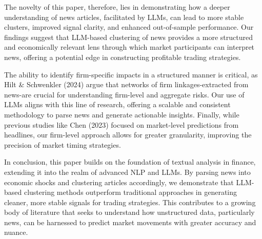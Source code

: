 The novelty of this paper, therefore, lies in demonstrating how a deeper understanding of news articles, facilitated by LLMs, can lead to more stable clusters, improved signal clarity, and enhanced out-of-sample performance. Our findings suggest that LLM-based clustering of news provides a more structured and economically relevant lens through which market participants can interpret news, offering a potential edge in constructing profitable trading strategies.

The ability to identify firm-specific impacts in a structured manner is critical, as Hilt \& Schwenkler (2024) argue that networks of firm linkages-extracted from news-are crucial for understanding firm-level and aggregate risks. Our use of LLMs aligns with this line of research, offering a scalable and consistent methodology to parse news and generate actionable insights. Finally, while previous studies like Chen (2023) focused on market-level predictions from headlines, our firm-level approach allows for greater granularity, improving the precision of market timing strategies.

In conclusion, this paper builds on the foundation of textual analysis in finance, extending it into the realm of advanced NLP and LLMs. By parsing news into economic shocks and clustering articles accordingly, we demonstrate that LLM-based clustering methods outperform traditional approaches in generating cleaner, more stable signals for trading strategies. This contributes to a growing body of literature that seeks to understand how unstructured data, particularly news, can be harnessed to predict market movements with greater accuracy and nuance.

%


